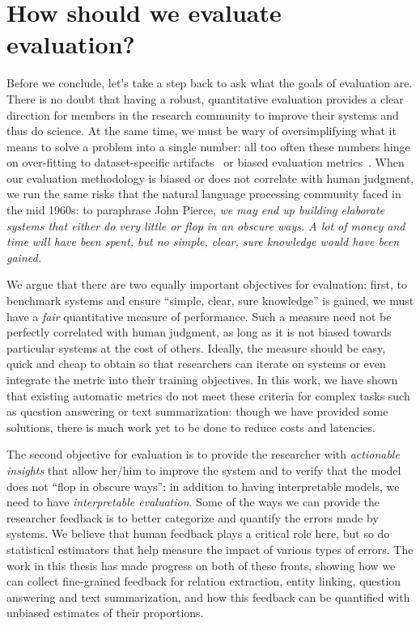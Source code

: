 \section{How should we evaluate evaluation?}
Before we conclude, let's take a step back to ask what the goals of evaluation are.
There is no doubt that having a robust, quantitative evaluation provides a clear direction for members in the research community to improve their systems and thus do science.
At the same time, we must be wary of oversimplifying what it means to solve a problem into a single number:
all too often these numbers hinge on over-fitting to dataset-specific artifacts~\citep{gururangan2018annotation} or biased evaluation metrics~\citep{chaganty2017unbiased}.
When our evaluation methodology is biased or does not correlate with human judgment, we run the same risks that the natural language processing community faced in the mid 1960s: 
to paraphrase John Pierce, \textit{we may end up building elaborate systems that either do very little or flop in an obscure ways. A lot of money and time will have been spent, but no simple, clear, sure knowledge would have been gained.}

We argue that there are two equally important objectives for evaluation: first, to benchmark systems and ensure ``simple, clear, sure knowledge'' is gained, we must have a \textit{fair} quantitative measure of performance.
Such a measure need not be perfectly correlated with human judgment, as long as it is not biased towards particular systems at the cost of others.
Ideally, the measure should be easy, quick and cheap to obtain so that researchers can iterate on systems or even integrate the metric into their training objectives.
In this work, we have shown that existing automatic metrics do not meet these criteria for complex tasks such as question answering or text summarization: though we have provided some solutions, there is much work yet to be done to reduce costs and latencies.

The second objective for evaluation is to provide the researcher with \textit{actionable insights} that allow her/him to improve the system and to verify that the model does not ``flop in obscure ways'':
  in addition to having interpretable models, we need to have \textit{interpretable evaluation}.
Some of the ways we can provide the researcher feedback is to better categorize and quantify the errors made by systems.
We believe that human feedback plays a critical role here, but so do statistical estimators that help measure the impact of various types of errors.
The work in this thesis has made progress on both of these fronts, showing how we can collect fine-grained feedback for relation extraction, entity linking, question answering and text summarization, and how this feedback can be quantified with unbiased estimates of their proportions.

